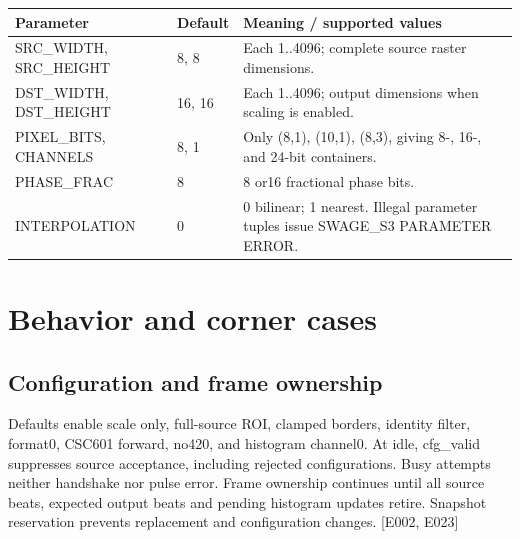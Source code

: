 \documentclass[11pt,a4paper]{article}
\begin{document}
{\small\renewcommand{\arraystretch}{1.18}\begin{longtable}{@{}L{0.22\textwidth}|L{0.21\textwidth}|L{0.49\textwidth}@{}}\toprule

\textbf{Parameter} & \textbf{Default} & \textbf{Meaning /\allowbreak{} supported values}\\\midrule\endhead

SRC\_\allowbreak{}WIDTH,\allowbreak{} SRC\_\allowbreak{}HEIGHT & 8,\allowbreak{} 8 & Each 1..4096; complete source raster dimensions.\\[2pt]\hline

DST\_\allowbreak{}WIDTH,\allowbreak{} DST\_\allowbreak{}HEIGHT & 16,\allowbreak{} 16 & Each 1..4096; output dimensions when scaling is enabled.\\[2pt]\hline

PIXEL\_\allowbreak{}BITS,\allowbreak{} CHANNELS & 8,\allowbreak{} 1 & Only (\allowbreak{}8,\allowbreak{}1)\allowbreak{},\allowbreak{} (\allowbreak{}10,\allowbreak{}1)\allowbreak{},\allowbreak{} (\allowbreak{}8,\allowbreak{}3)\allowbreak{},\allowbreak{} giving 8-,\allowbreak{} 16-,\allowbreak{} and 24-bit containers.\\[2pt]\hline

PHASE\_\allowbreak{}FRAC & 8 & 8 or16 fractional phase bits.\\[2pt]\hline

INTERPOLATION & 0 & 0 bilinear; 1 nearest. Illegal parameter tuples issue SWAGE\_\allowbreak{}S3 PARAMETER ERROR.\\[2pt]\hline

\bottomrule\end{longtable}}

\section{Behavior and corner cases}

\subsection{Configuration and frame ownership}

Defaults enable scale only,\allowbreak{} full-source ROI,\allowbreak{} clamped borders,\allowbreak{} identity filter,\allowbreak{} format0,\allowbreak{} CSC601 forward,\allowbreak{} no420,\allowbreak{} and histogram channel0. At idle,\allowbreak{} cfg\_\allowbreak{}valid suppresses source acceptance,\allowbreak{} including rejected configurations. Busy attempts neither handshake nor pulse error. Frame ownership continues until all source beats,\allowbreak{} expected output beats and pending histogram updates retire. Snapshot reservation prevents replacement and configuration changes. [\allowbreak{}E002,\allowbreak{} E023]\allowbreak{}
\end{document}
